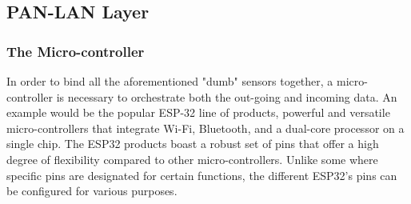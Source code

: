 \documentclass[11pt]{article}
\begin{document}
\newpage
\subsection{PAN-LAN Layer}
\subsubsection{The Micro-controller}
In order to bind all the aforementioned "dumb" sensors together, a micro-controller is necessary to orchestrate both the out-going and incoming data. An example would be the popular ESP-32 line of products, powerful and versatile micro-controllers that integrate Wi-Fi, Bluetooth, and a dual-core processor on a single chip. The ESP32 products boast a robust set of pins that offer a high degree of flexibility compared to other micro-controllers. Unlike some where specific pins are designated for certain functions, the different ESP32's pins can be configured for various purposes. \par
\vspace{0.5 cm}
\end{document}
